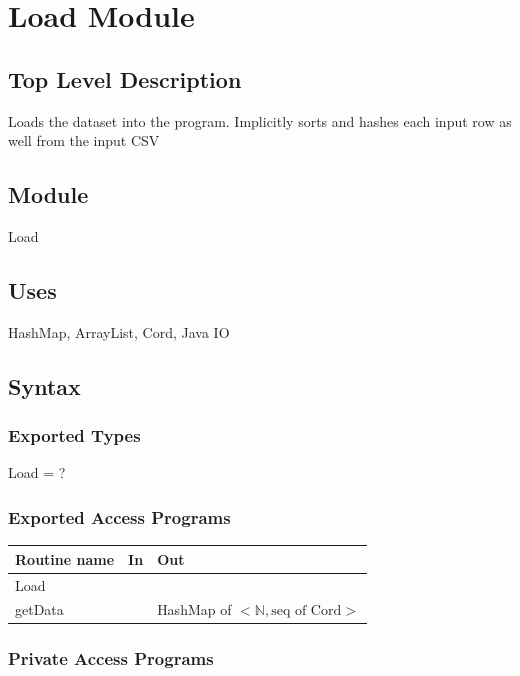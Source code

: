 \documentclass[12pt]{article}
\begin{document}
\section*{Load Module}

\subsection* {Top Level Description}

Loads the dataset into the program. Implicitly sorts and hashes each input row as well 
from the input CSV

\subsection*{Module}

Load

\subsection* {Uses}

HashMap, ArrayList, Cord, Java IO

\subsection* {Syntax}

\subsubsection* {Exported Types}

Load = ?

\subsubsection* {Exported Access Programs}

\begin{tabular}{| l | l | l |}
\hline
\textbf{Routine name} & \textbf{In} & \textbf{Out}\\
\hline
Load & ~ & ~ \\
\hline
getData & ~ & HashMap of $<\mathbb{N}, \mbox{seq of Cord}>$\\
\hline
\end{tabular}

\subsubsection* {Private Access Programs}
\end{document}
